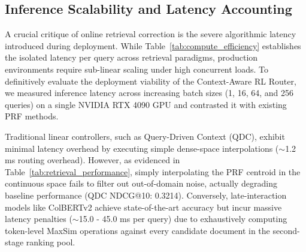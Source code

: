 \subsection{Inference Scalability and Latency Accounting}
A crucial critique of online retrieval correction is the severe algorithmic latency introduced during deployment. While Table~\ref{tab:compute_efficiency} establishes the isolated latency per query across retrieval paradigms, production environments require sub-linear scaling under high concurrent loads. To definitively evaluate the deployment viability of the Context-Aware RL Router, we measured inference latency across increasing batch sizes (1, 16, 64, and 256 queries) on a single NVIDIA RTX 4090 GPU and contrasted it with existing PRF methods.

\begin{table}[htbp]
    \caption{Compute \& VRAM Efficiency}
    \begin{center}
    \end{center}
    \label{tab:compute_efficiency}
\end{table}

Traditional linear controllers, such as Query-Driven Context (QDC), exhibit minimal latency overhead by executing simple dense-space interpolations ($\sim$1.2 ms routing overhead). However, as evidenced in Table~\ref{tab:retrieval_performance}, simply interpolating the PRF centroid in the continuous space fails to filter out out-of-domain noise, actually degrading baseline performance (QDC NDCG@10: 0.3214). Conversely, late-interaction models like ColBERTv2 achieve state-of-the-art accuracy but incur massive latency penalties ($\sim$15.0 - 45.0 ms per query) due to exhaustively computing token-level MaxSim operations against every candidate document in the second-stage ranking pool.

